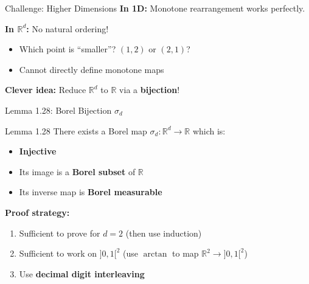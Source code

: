 \documentclass[aspectratio=169]{beamer}
\newcommand{\R}{\mathbb{R}}
\begin{document}
\begin{frame}{Challenge: Higher Dimensions}
\textbf{In 1D:} Monotone rearrangement works perfectly.

\vspace{0.3cm}
\textbf{In $\R^d$:} No natural ordering!
\begin{itemize}
    \item Which point is ``smaller''? $(1, 2)$ or $(2, 1)$?
    \item Cannot directly define monotone maps
\end{itemize}

\vspace{0.4cm}
\textbf{Clever idea:} Reduce $\R^d$ to $\R$ via a \textbf{bijection}!

\begin{center}
\end{center}
\end{frame}

\begin{frame}{Lemma 1.28: Borel Bijection $\sigma_d$}
\begin{block}{Lemma 1.28}
There exists a Borel map $\sigma_d : \R^d \to \R$ which is:
\begin{itemize}
    \item \textbf{Injective}
    \item Its image is a \textbf{Borel subset} of $\R$
    \item Its inverse map is \textbf{Borel measurable}
\end{itemize}
\end{block}

\vspace{0.4cm}
\textbf{Proof strategy:}
\begin{enumerate}
    \item Sufficient to prove for $d = 2$ (then use induction)
    \item Sufficient to work on $]0,1[^2$ (use $\arctan$ to map $\R^2 \to ]0,1[^2$)
    \item Use \textbf{decimal digit interleaving}
\end{enumerate}
\end{frame}
\end{document}
